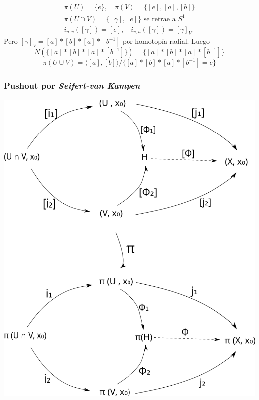 \documentclass[xetex,mathserif,serif]{beamer}
\newcommand{\vank}{\emph{Seifert-van Kampen} }
\begin{document}
\begin{frame}
\begin{center}
    \end{center}
    \pause
    \begin{gather*}
      \pi (U) = \{e\}, \quad \pi (V) = \{[e], [a], [b]\} \\
      \pi (U \cap V) = \{[\gamma], [e]\} \text{ se retrae a } S^1 \\
      i_{u,v} ([\gamma]) = [e], \quad i_{v,u} ([\gamma]) = [\gamma]_V
    \end{gather*}
    Pero \([\gamma]_{V} = [a]*[b]*[a]*[b^{-1}] \) por homotopía
    radial. Luego
    \[ N \left( \{[a]*[b]*[a]*[b^{-1}]\} \right) = \{[a]*[b]*[a]*[b^{-1}]\} \]
    \[ \pi (U \cup V) = \langle [a], [b] \rangle /
      \{[a]*[b]*[a]*[b^{-1}] = e\}\]
  \end{frame}

  \begin{frame}
    \frametitle{Pushout por \vank}
    \begin{center}
      \includegraphics[scale=0.33]{../tesis/imagenes/pushoutHotop.png}
    \end{center}
  \end{frame}
\end{document}
